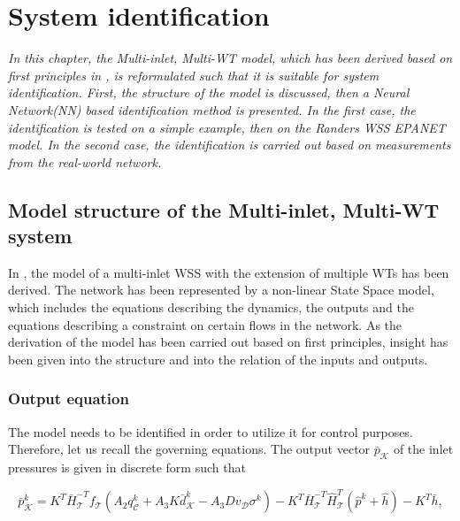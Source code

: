 \chapter{System identification}
\label{identification_design}

\emph{In this chapter, the Multi-inlet, Multi-WT model, which has been derived based on first principles in , is reformulated such that it is suitable for system identification. First, the structure of the model is discussed, then a Neural Network(NN) based identification method is presented. In the first case, the identification is tested on a simple example, then on the Randers WSS EPANET model. In the second case, the identification is carried out based on measurements from the real-world network.}

\section{Model structure of the Multi-inlet, Multi-WT system}
\label{model_structure_of_the_multi_inlet_multi_WT_system}

In , the model of a multi-inlet WSS with the extension of multiple WTs has been derived. The network has been represented by a non-linear State Space model, which includes the equations describing the dynamics, the outputs and the equations describing a constraint on certain flows in the network. As the derivation of the model has been carried out based on first principles, insight has been given into the structure and into the relation of the inputs and outputs. 

\subsection{Output equation}
\label{output_eq_identification}

The model needs to be identified in order to utilize it for control purposes. Therefore, let us recall the governing equations. The output vector $\bar{p}_{\mathcal{K}}$ of the inlet pressures is given in discrete form such that

\begin{equation}
  \label{recall_output_eq}
  \bar{p}^{k}_{\mathcal{K}} = K^T \bar{H}^{-T}_{\mathcal{T}}f_{\mathcal{T}}(A_2 q^{k}_{\mathcal{C}} + A_3 K \bar{d}^{k}_{\mathcal{K}} - A_3 D v_{\mathcal{D}} \sigma^{k}) - K^T\bar{H}^{-T}_{\mathcal{T}}\hat{H}^{T}_{\mathcal{T}} (\hat{p}^{k} + \hat{h}) - K^T\bar{h} ,
\end{equation} 

